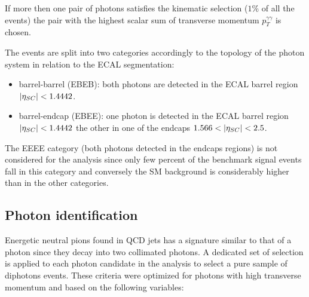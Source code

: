 If more then one pair of photons satisfies the kinematic selection ($1\%$ of all the events) the pair
with the highest scalar sum of transverse momentum $p_T^{\gamma\gamma}$ is chosen.

The events are split into two categories accordingly to the topology of the photon system in relation
to the ECAL segmentation:
\begin{itemize}
\item barrel-barrel (EBEB): both photons are detected in the ECAL barrel region $|\eta_{SC}| < 1.4442$.
\item barrel-endcap (EBEE): one photon is detected in the ECAL barrel region $|\eta_{SC}| < 1.4442$ the other
  in one of the endcaps $1.566 < |\eta_{SC}| < 2.5$.
\end{itemize}

The EEEE category (both photons detected in the endcaps regions) is not considered for the analysis
since only few percent of the benchmark signal events fall in this category and conversely the SM
background is considerably higher than in the other categories.

\subsection{Photon identification}
Energetic neutral pions found in QCD jets has a signature similar to that of a photon since they decay into two collimated
photons. A dedicated set of selection is applied to each photon candidate in the analysis to select a pure
sample of diphotons events. These criteria were optimized for photons with high transverse
momentum and based on the following variables:

